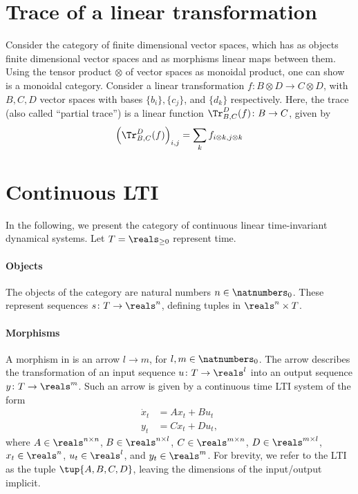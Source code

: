 

\section{Trace of a linear transformation}
Consider the category \FinVect of finite dimensional vector spaces, which has as objects finite dimensional vector spaces and as morphisms linear maps between them. Using the tensor product $\otimes$ of vector spaces as monoidal product, one can show \FinVect is a monoidal category. Consider a linear transformation $f\colon B\otimes D\to C\otimes D$, with $B,C,D$ vector spaces with bases $\{b_i\},\{c_j\}$, and $\{d_k\}$ respectively. Here, the trace (also called ``partial trace'') is a linear function $\Tr_{B,C}
^D(f)\colon B\to C$, given by
\begin{equation}
    \left(\Tr_{B,C}
    ^D(f) \right)_{i,j}=\sum_{k}f_{i\otimes k,j\otimes k}
\end{equation}



\section{Continuous LTI}
In the following, we present the category of continuous linear time-invariant dynamical systems. Let $T=\reals_{\geq 0}$ represent time.

\paragraph{Objects} The objects of the category are natural numbers $n\in \natnumbers_0$. These represent sequences $s\colon T\to \reals^n$, defining tuples in $\reals^n\times T$.

\paragraph{Morphisms} A morphism in \LTI is an arrow $l\to m$, for $l,m\in \natnumbers_0$. The arrow describes the transformation of an input sequence $u\colon T\to \reals^l$ into an output sequence $y\colon T\to \reals^m$. Such an arrow is given by a continuous time LTI system of the form
\begin{equation}
    \begin{aligned}
        \dot{x}_t&=A x_t+B u_t\\
        y_t&=C x_t +D u_t,
    \end{aligned}
\end{equation}
where $A\in \reals^{n\times n}$, $B\in \reals^{n\times l}$, $C\in \reals^{m\times n}$, $D\in \reals^{m\times l}$, $x_t\in \reals^n$, $u_t\in \reals^l$, and $y_t\in \reals^m$. For brevity, we refer to the LTI as the tuple $\tup{A,B,C,D}$, leaving the dimensions of the input/output implicit.


